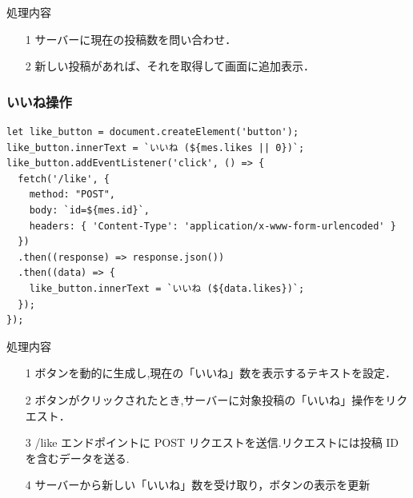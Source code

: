 \documentclass[uplatex,dvipdfmx]{jsarticle}
\begin{document}
\begin{itembox}[c]{処理内容}
    \begin{enumerate}
        \setlength{\leftskip}{0pt}
        \item[1]サーバーに現在の投稿数を問い合わせ．
        \item[2]新しい投稿があれば、それを取得して画面に追加表示．
    \end{enumerate}
\end{itembox}

\subsubsection{いいね操作}
\begin{lstlisting}[label=k]
let like_button = document.createElement('button');
like_button.innerText = `いいね (${mes.likes || 0})`;
like_button.addEventListener('click', () => {
  fetch('/like', {
    method: "POST",
    body: `id=${mes.id}`,
    headers: { 'Content-Type': 'application/x-www-form-urlencoded' }
  })
  .then((response) => response.json())
  .then((data) => {
    like_button.innerText = `いいね (${data.likes})`;
  });
});
\end{lstlisting}

\begin{itembox}[c]{処理内容}
    \begin{enumerate}
        \setlength{\leftskip}{0pt}
        \item[1]ボタンを動的に生成し,現在の「いいね」数を表示するテキストを設定．
        \item[2]ボタンがクリックされたとき,サーバーに対象投稿の「いいね」操作をリクエスト．
        \item[3]/like エンドポイントに POST リクエストを送信.リクエストには投稿 ID を含むデータを送る.
        \item[4]サーバーから新しい「いいね」数を受け取り，ボタンの表示を更新
    \end{enumerate}
\end{itembox}
\end{document}
